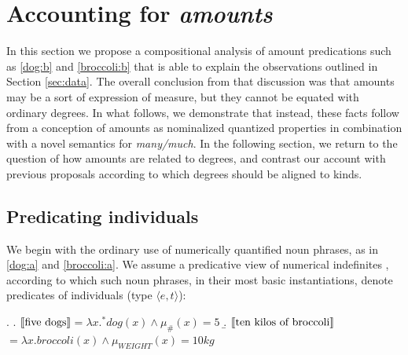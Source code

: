 \documentclass[a4paper,12pt,twoside]{article}
\newcommand{\sv}[1]{\ensuremath{\llbracket\textnormal{#1}\rrbracket}}
\newcommand{\red}[1]{\textcolor{red}{\sffamily#1}}
\begin{document}
	\section{Accounting for \textit{amounts}}
	
	
	In this section we propose a compositional analysis of amount predications such as \ref{dog:b} and \ref{broccoli:b} that is able to explain the observations outlined in Section \ref{sec:data}. The overall conclusion from that discussion was that amounts may be a sort of expression of measure, but they cannot be equated with ordinary degrees.  In what follows, we demonstrate that instead, these facts follow from a conception of amounts as nominalized quantized properties in combination with a novel  semantics for \textit{many/much}. In the following section, we return to the question of how amounts are related to degrees, and contrast our account with previous proposals according to which degrees should be aligned to kinds.
	
	
	\subsection{Predicating individuals}
	
	
	We begin with the ordinary use of numerically quantified noun phrases, as in \ref{dog:a} and \ref{broccoli:a}. We assume a predicative view of numerical indefinites \citep[as e.g.\ in][]{Landman:2004}, according to which such noun phrases, in their most basic instantiations, denote predicates of individuals (type $\langle e,t \rangle$):
	
	
	
	\ex.
	\a. \sv{five dogs}$=\lambda x.^*\!dog(x) \wedge \mu_{\#}(x)=5$
	\b. \sv{ten kilos of broccoli}$=\lambda x.broccoli(x) \wedge \mu_{WEIGHT}(x)=10kg$
	
\end{document}
